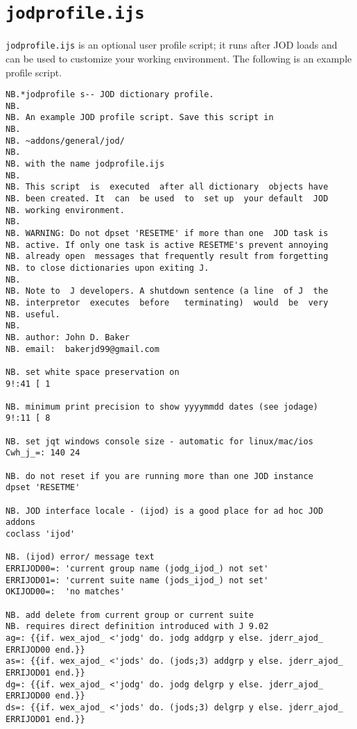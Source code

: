    \newpage
   \section{\texttt{jodprofile.ijs}}\label{ap:jodprofile}
   
\verb|jodprofile.ijs| is an optional user profile script; it runs after
JOD loads and can be used to customize your working environment.  The following is an example
profile script. 


\begin{lstlisting}[frame=single,framerule=0pt,basicstyle=\ttfamily\footnotesize]
NB.*jodprofile s-- JOD dictionary profile.
NB.
NB. An example JOD profile script. Save this script in
NB.
NB. ~addons/general/jod/
NB.
NB. with the name jodprofile.ijs
NB.
NB. This script  is  executed  after all dictionary  objects have
NB. been created. It  can  be used  to  set up  your default  JOD
NB. working environment.
NB.
NB. WARNING: Do not dpset 'RESETME' if more than one  JOD task is
NB. active. If only one task is active RESETME's prevent annoying
NB. already open  messages that frequently result from forgetting
NB. to close dictionaries upon exiting J.
NB.
NB. Note to  J developers. A shutdown sentence (a line  of J  the
NB. interpretor  executes  before   terminating)  would  be  very
NB. useful.
NB.
NB. author: John D. Baker
NB. email:  bakerjd99@gmail.com

NB. set white space preservation on
9!:41 [ 1

NB. minimum print precision to show yyyymmdd dates (see jodage)
9!:11 [ 8

NB. set jqt windows console size - automatic for linux/mac/ios
Cwh_j_=: 140 24

NB. do not reset if you are running more than one JOD instance
dpset 'RESETME'

NB. JOD interface locale - (ijod) is a good place for ad hoc JOD addons 
coclass 'ijod'

NB. (ijod) error/ message text
ERRIJOD00=: 'current group name (jodg_ijod_) not set'
ERRIJOD01=: 'current suite name (jods_ijod_) not set'
OKIJOD00=:  'no matches'

NB. add delete from current group or current suite 
NB. requires direct definition introduced with J 9.02
ag=: {{if. wex_ajod_ <'jodg' do. jodg addgrp y else. jderr_ajod_ ERRIJOD00 end.}}
as=: {{if. wex_ajod_ <'jods' do. (jods;3) addgrp y else. jderr_ajod_ ERRIJOD01 end.}}
dg=: {{if. wex_ajod_ <'jodg' do. jodg delgrp y else. jderr_ajod_ ERRIJOD00 end.}}
ds=: {{if. wex_ajod_ <'jods' do. (jods;3) delgrp y else. jderr_ajod_ ERRIJOD01 end.}}
   

\end{lstlisting}
